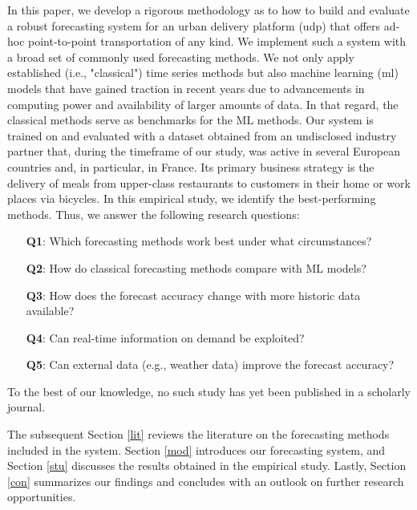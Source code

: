 In this paper, we develop a rigorous methodology as to how to build and
    evaluate a robust forecasting system for an urban delivery platform
    (\gls{udp}) that offers ad-hoc point-to-point transportation of any kind.
We implement such a system with a broad set of commonly used forecasting
    methods.
We not only apply established (i.e., "classical") time series methods but also
    machine learning (\gls{ml}) models that have gained traction in recent
    years due to advancements in computing power and availability of larger
    amounts of data.
In that regard, the classical methods serve as benchmarks for the ML methods.
Our system is trained on and evaluated with a dataset obtained from an
    undisclosed industry partner that, during the timeframe of our study, was
    active in several European countries and, in particular, in France.
Its primary business strategy is the delivery of meals from upper-class
    restaurants to customers in their home or work places via bicycles.
In this empirical study, we identify the best-performing methods.
Thus, we answer the following research questions:
\begin{enumerate}
\item[\textbf{Q1}:]
    Which forecasting methods work best under what circumstances?
\item[\textbf{Q2}:]
    How do classical forecasting methods compare with ML models?
\item[\textbf{Q3}:]
    How does the forecast accuracy change with more historic data available?
\item[\textbf{Q4}:]
    Can real-time information on demand be exploited?
\item[\textbf{Q5}:]
    Can external data (e.g., weather data) improve the forecast accuracy?
\end{enumerate}
To the best of our knowledge, no such study has yet been published in a
    scholarly journal.

The subsequent Section \ref{lit} reviews the literature on the forecasting
    methods included in the system.
Section \ref{mod} introduces our forecasting system, and Section \ref{stu}
    discusses the results obtained in the empirical study.
Lastly, Section \ref{con} summarizes our findings and concludes
    with an outlook on further research opportunities.